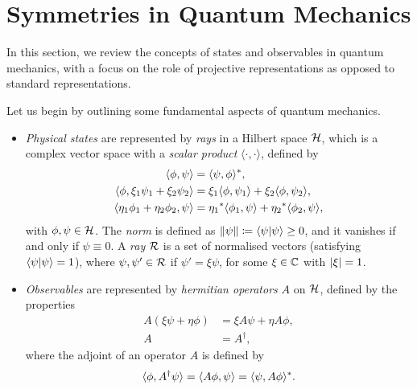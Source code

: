 \section{Symmetries in Quantum Mechanics}\label{sec:symmetries-qm}
In this section, we review the concepts of states and observables in quantum mechanics, with a focus on the role of projective representations as opposed to standard representations.

Let us begin by outlining some fundamental aspects of quantum mechanics.
\begin{itemize}
    \item \emph{Physical states} are represented by \emph{rays} in a Hilbert space $\mathcal{H}$, which is a complex vector space with a \emph{scalar product} $\langle \cdot, \cdot \rangle$, defined by
    \begin{subequations}\label{eq:scalar-product}
        \begin{align}
        \langle \phi, \psi \rangle &= \langle \psi, \phi \rangle^* , \\
        \langle \phi, \xi_1 \psi_1 + \xi_2 \psi_2 \rangle &= \xi_1 \langle \phi, \psi_1 \rangle + \xi_2 \langle \phi, \psi_2 \rangle ,\\
        \langle \eta_1 \phi_1 + \eta_2 \phi_2, \psi \rangle &= {\eta_1}^* \langle \phi_1, \psi \rangle + {\eta_2}^* \langle \phi_2, \psi \rangle ,
        \end{align}
        \end{subequations}
    with $\phi,\psi \in \mathcal{H}$. The \emph{norm} is defined as $\lVert\psi\rVert \coloneq \braket{\psi}{\psi} \geq 0$, and it vanishes if and only if $\psi \equiv 0$. A \emph{ray} $\mathcal{R}$ is a set of normalised vectors (satisfying $\braket{\psi}{\psi} = 1$), where $\psi, \psi' \in \mathcal{R}$ if $\psi' = \xi \psi$, for some $\xi \in \mathbb{C}$ with $\abs{\xi} = 1$.
    \item \emph{Observables} are represented by \emph{hermitian operators} $A$ on $\mathcal{H}$, defined by the properties
    \begin{subequations}
    \begin{align}
        A (\xi \psi + \eta \phi) &= \xi A\psi + \eta A \phi ,\\
        A &= A^\dagger ,
    \end{align}
    \end{subequations}
    where the adjoint of an operator $A$ is defined by
    \begin{equation}\label{eq:def-adjoint}
        \langle \phi, A^\dagger \psi \rangle = \langle A\phi, \psi \rangle = \langle \psi, A\phi \rangle^* .
    \end{equation}


\end{itemize}
